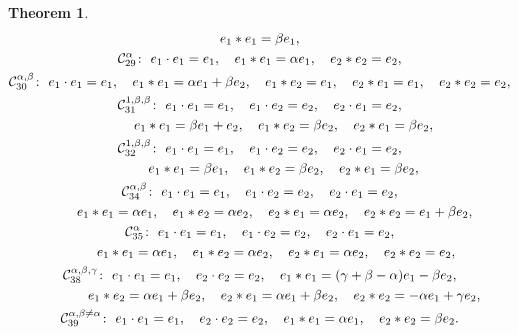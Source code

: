 \documentclass[pdftex]{sigma}
\numberwithin{equation}{section}
\newtheorem{Theorem}{Theorem}[section]
\begin{document}
\begin{Theorem}
\begin{gather*}
 e_{1}\ast e_{1}=\beta e_{1},
\\
 \mathcal{C}_{29}^{\alpha }\colon\
 e_{1}\cdot e_{1}=e_{1}, \quad
 e_{1}\ast e_{1}=\alpha e_{1}, \quad e_{2}\ast e_{2}=e_{2},
\\
 \mathcal{C}_{30}^{\alpha ,\beta }\colon\
 e_{1}\cdot e_{1}=e_{1}, \quad
 e_{1}\ast e_{1}=\alpha e_{1}+\beta e_{2}, \quad e_{1}\ast e_{2}=e_{1}, \quad
e_{2}\ast e_{1}=e_{1}, \quad
 e_{2}\ast e_{2}=e_{2},
\\
 \mathcal{C}_{31}^{1 ,\beta ,\beta } \colon\
 e_{1}\cdot e_{1}=e_{1}, \quad e_{1}\cdot e_{2}= e_{2}, \quad e_{2}\cdot
e_{1}=e_{2}, \\
\hphantom{\mathcal{C}_{31}^{1 ,\beta ,\beta } \colon} \ e_{1}\ast e_{1}=\beta e_{1}+e_{2}, \quad e_{1}\ast e_{2}=\beta e_{2}, \quad
e_{2}\ast e_{1}=\beta e_{2},
\\
 \mathcal{C}_{32}^{1 ,\beta ,\beta }\colon\
 e_{1}\cdot e_{1}=e_{1}, \quad e_{1}\cdot e_{2}= e_{2}, \quad e_{2}\cdot
e_{1}=e_{2}, \\
\hphantom{\mathcal{C}_{32}^{1 ,\beta ,\beta }\colon} \ e_{1}\ast e_{1}=\beta e_{1}, \quad e_{1}\ast e_{2}=\beta e_{2}, \quad
e_{2}\ast e_{1}=\beta e_{2},
 \\
 \mathcal{C}_{34}^{\alpha ,\beta }\colon\
 e_{1}\cdot e_{1}=e_{1}, \quad e_{1}\cdot e_{2}=e_{2}, \quad e_{2}\cdot
e_{1}=e_{2}, \\
\hphantom{\mathcal{C}_{34}^{\alpha ,\beta }} \ e_{1}\ast e_{1}=\alpha e_{1}, \quad e_{1}\ast e_{2}=\alpha e_{2}, \quad
e_{2}\ast e_{1}=\alpha e_{2}, \quad e_{2}\ast e_{2}=e_{1}+\beta e_{2},
\\
 \mathcal{C}_{35}^{\alpha }\colon\
 e_{1}\cdot e_{1}=e_{1}, \quad e_{1}\cdot e_{2}=e_{2}, \quad e_{2}\cdot
e_{1}=e_{2}, \\
\hphantom{\mathcal{C}_{35}^{\alpha }\colon} \ e_{1}\ast e_{1}=\alpha e_{1}, \quad e_{1}\ast e_{2}=\alpha e_{2}, \quad
e_{2}\ast e_{1}=\alpha e_{2}, \quad e_{2}\ast e_{2}=e_{2},
 \\
 \mathcal{C}_{38}^{\alpha ,\beta ,\gamma }\colon\
 e_{1}\cdot e_{1}=e_{1}, \quad e_{2}\cdot e_{2}=e_{2}, \quad
 e_{1}\ast e_{1}=( \gamma +\beta -\alpha ) e_{1}-\beta e_{2},\\
\hphantom{\mathcal{C}_{38}^{\alpha ,\beta ,\gamma }\colon} \ e_{1}\ast e_{2}=\alpha e_{1}+\beta e_{2}, \quad
 e_{2}\ast e_{1}=\alpha
e_{1}+\beta e_{2}, \quad e_{2}\ast e_{2}=-\alpha e_{1}+\gamma e_{2},
\\
 \mathcal{C}_{39}^{\alpha ,\beta \neq \alpha }\colon\
 e_{1}\cdot e_{1}=e_{1}, \quad e_{2}\cdot e_{2}=e_{2}, \quad
 e_{1}\ast e_{1}=\alpha e_{1}, \quad e_{2}\ast e_{2}=\beta e_{2}.
 \end{gather*}


\end{Theorem}
\end{document}
